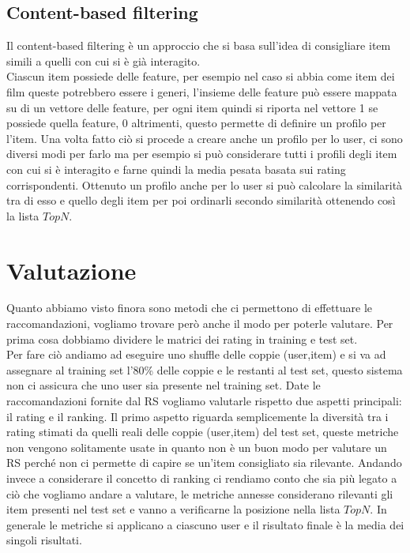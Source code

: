\subsection{Content-based filtering}
Il content-based filtering è un approccio che si basa sull'idea di consigliare item simili a quelli con cui si è già interagito.\\
Ciascun item possiede delle feature, per esempio nel caso si abbia come item dei film queste potrebbero essere i generi, l'insieme delle feature può essere mappata su di un vettore delle feature, per ogni item quindi si riporta nel vettore 1 se possiede quella feature, 0 altrimenti, questo permette di definire un profilo per l'item.
Una volta fatto ciò si procede a creare anche un profilo per lo user, ci sono diversi modi per farlo ma per esempio si può considerare tutti i profili degli item con cui si è interagito e farne quindi la media pesata basata sui rating corrispondenti.
Ottenuto un profilo anche per lo user si può calcolare la similarità tra di esso e quello degli item per poi ordinarli secondo similarità ottenendo così la lista $TopN$.

\section{Valutazione}
Quanto abbiamo visto finora sono metodi che ci permettono di effettuare le raccomandazioni, vogliamo trovare però anche il modo per poterle valutare. Per prima cosa dobbiamo dividere le matrici dei rating in training e test set.\\
Per fare ciò andiamo ad eseguire uno shuffle delle coppie (user,item) e si va ad assegnare al training set l'80\% delle coppie e le restanti al test set, questo sistema non ci assicura che uno user sia presente nel training set.
Date le raccomandazioni fornite dal RS vogliamo valutarle rispetto due aspetti principali: il rating e il ranking.
Il primo aspetto riguarda semplicemente la diversità tra i rating stimati da quelli reali delle coppie (user,item) del test set, queste metriche non vengono solitamente usate in quanto non è un buon modo per valutare un RS perché non ci permette di capire se un'item consigliato sia rilevante.
Andando invece a considerare il concetto di ranking ci rendiamo conto che sia più legato a ciò che vogliamo andare a valutare, le metriche annesse considerano rilevanti gli item presenti nel test set e vanno a verificarne la posizione nella lista $TopN$.
In generale le metriche si applicano a ciascuno user e il risultato finale è la media dei singoli risultati.

